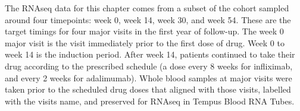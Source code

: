 %
%
%

%
The \gls{RNAseq} data for this chapter comes from a subset of the cohort sampled around four timepoints: week 0, week 14, week 30, and week 54.
These are the target timings for four major visits in the first year of follow-up.
The week 0 major visit is the visit immediately prior to the first dose of drug.
Week 0 to week 14 is the induction period.
After week 14, patients continued to take their drug according to the prescribed schedule (a dose every 8 weeks for infliximab, and every 2 weeks for adalimumab).
Whole blood samples at major visits were taken prior to the scheduled drug doses that aligned with those visits, labelled with the visits name, and preserved for \gls{RNAseq} in Tempus Blood RNA Tubes.

